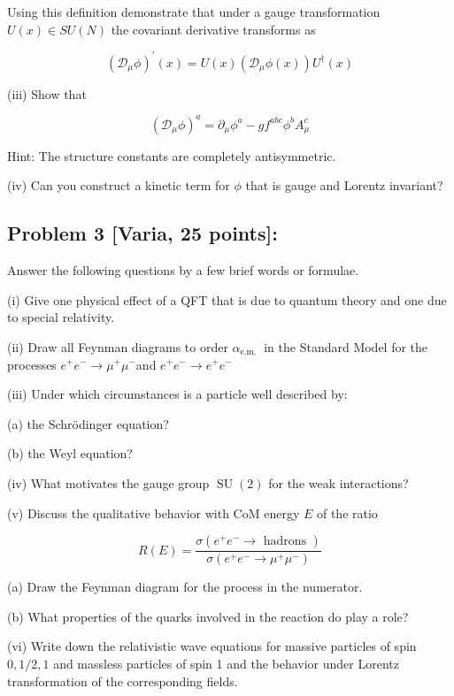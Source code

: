 \documentclass[10pt, letterpaper]{article}
\begin{document}
Using this definition demonstrate that under a gauge transformation $U(x) \in S U(N)$ the covariant derivative transforms as

$$
\left(\mathcal{D}_\mu \phi\right)^{\prime}(x)=U(x)\left(\mathcal{D}_\mu \phi(x)\right) U^{\dagger}(x)
$$

(iii) Show that

$$
\left(\mathcal{D}_\mu \phi\right)^a=\partial_\mu \phi^a-g f^{a b c} \phi^b A_\mu^c
$$


Hint: The structure constants are completely antisymmetric.

(iv) Can you construct a kinetic term for $\phi$ that is gauge and Lorentz invariant?




\subsection{Problem 3 [Varia, 25 points]:}

Answer the following questions by a few brief words or formulae.

(i) Give one physical effect of a QFT that is due to quantum theory and one due to special relativity.

(ii) Draw all Feynman diagrams to order $\alpha_{\text {e.m. }}$ in the Standard Model for the processes $e^{+} e^{-} \rightarrow \mu^{+} \mu^{-}$and $e^{+} e^{-} \rightarrow e^{+} e^{-}$

(iii) Under which circumstances is a particle well described by:

(a) the Schrödinger equation?

(b) the Weyl equation?

(iv) What motivates the gauge group $\operatorname{SU}(2)$ for the weak interactions?

(v) Discuss the qualitative behavior with CoM energy $E$ of the ratio

$$
R(E)=\frac{\sigma\left(e^{+} e^{-} \rightarrow \text { hadrons }\right)}{\sigma\left(e^{+} e^{-} \rightarrow \mu^{+} \mu^{-}\right)}
$$

(a) Draw the Feynman diagram for the process in the numerator.

(b) What properties of the quarks involved in the reaction do play a role?


(vi) Write down the relativistic wave equations for massive particles of spin $0,1 / 2,1$ and massless particles of spin 1 and the behavior under Lorentz transformation of the corresponding fields.
\end{document}

